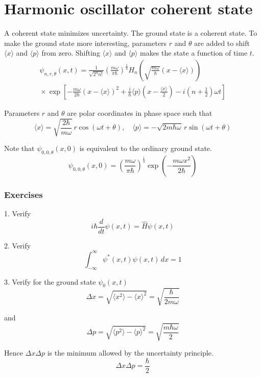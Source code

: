 

\section*{Harmonic oscillator coherent state}

A coherent state minimizes uncertainty.
The ground state is a coherent state.
To make the ground state more interesting, parameters $r$ and $\theta$ are added
to shift $\langle x\rangle$ and $\langle p\rangle$ from zero.
Shifting $\langle x\rangle$ and $\langle p\rangle$ makes the state a function of time $t$.
\begin{multline*}
\psi_{n,r,\theta}(x,t)
=\frac{1}{\sqrt{2^nn!}}
\left(\frac{m\omega}{\pi\hbar}\right)^\frac{1}{4}
H_n\left(\sqrt{\frac{m\omega}{\hbar}}\left(x-\langle x\rangle\right)\right)
\\{}\times
\exp\left[
-\frac{m\omega}{2\hbar}\left(x-\langle x\rangle\right)^2
+\frac{i}{\hbar}\langle p\rangle\left(x-\frac{\langle x\rangle}{2}\right)
-i\left(n+\frac{1}{2}\right)\omega t
\right]
\end{multline*}

Parameters $r$ and $\theta$ are polar coordinates in phase space such that
\begin{equation*}
\langle x\rangle=\sqrt{\frac{2\hbar}{m\omega}}\,r\cos(\omega t+\theta),\quad
\langle p\rangle=-\sqrt{2m\hbar\omega}\,r\sin(\omega t+\theta)
\end{equation*}

Note that $\psi_{0,0,\theta}(x,0)$ is equivalent to the ordinary ground state.
\begin{equation*}
\psi_{0,0,\theta}(x,0)=\left(\frac{m\omega}{\pi\hbar}\right)^\frac{1}{4}
\exp\left(-\frac{m\omega x^2}{2\hbar}\right)
\end{equation*}

\subsubsection*{Exercises}

1. Verify
\begin{equation*}
i\hbar\frac{d}{dt}\psi(x,t)=\hat H\psi(x,t)
\end{equation*}

2. Verify
\begin{equation*}
\int_{-\infty}^\infty\psi^*(x,t)\psi(x,t)\,dx=1
\end{equation*}

3. Verify for the ground state $\psi_0(x,t)$
\begin{equation*}
\Delta x=\sqrt{\langle x^2\rangle-\langle x\rangle^2}
=\sqrt{\frac{\hbar}{2m\omega}}
\end{equation*}

and
\begin{equation*}
\Delta p=\sqrt{\langle p^2\rangle-\langle p\rangle^2}
=\sqrt{\frac{m\hbar\omega}{2}}
\end{equation*}

Hence $\Delta x\Delta p$ is the minimum allowed by the uncertainty principle.
\begin{equation*}
\Delta x\Delta p=\frac{\hbar}{2}
\end{equation*}


